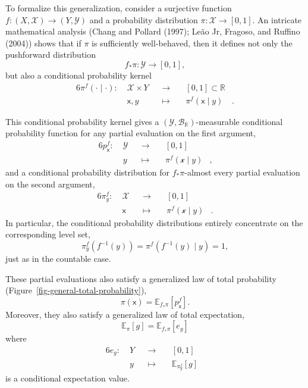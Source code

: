 \documentclass[
  letterpaper,
  DIV=11,
  numbers=noendperiod]{scrartcl}
\begin{document}
To formalize this generalization, consider a surjective function
\(f : (X, \mathcal{X}) \rightarrow (Y, \mathcal{Y})\) and a probability
distribution \(\pi : \mathcal{X} \rightarrow [0, 1]\). An intricate
mathematical analysis (Chang and Pollard (1997); Leão Jr, Fragoso, and
Ruffino (2004)) shows that if \(\pi\) is sufficiently well-behaved, then
it defines not only the pushforward distribution \[
f_{*} \pi : \mathcal{Y} \rightarrow [0, 1],
\] but also a conditional probability kernel \begin{alignat*}{6}
\pi^{f} ( \cdot \mid \cdot )
:\; &\mathcal{X} \times Y& &\rightarrow& \; &[0, 1] \subset \mathbb{R}&
\\
&\mathsf{x}, y& &\mapsto& &\pi^{f} ( \mathsf{x} \mid y )&.
\end{alignat*}

This conditional probability kernel gives a
\((\mathcal{Y}, \mathcal{B}_{\mathbb{R}})\)-measurable conditional
probability function for any partial evaluation on the first argument,
\begin{alignat*}{6}
p^{f}_{ \mathsf{x} }
:\; &\mathcal{Y}& &\rightarrow& \; &[0, 1]&
\\
&y& &\mapsto& &\pi^{f} ( \mathcal{x} \mid y ) &,
\end{alignat*} and a conditional probability distribution for
\(f_{*} \pi\)-almost every partial evaluation on the second argument,
\begin{alignat*}{6}
\pi^{f}_{y}
:\; &\mathcal{X}& &\rightarrow& \; &[0, 1]&
\\
&\mathsf{x}& &\mapsto& &\pi^{f} ( \mathcal{x} \mid y ) &.
\end{alignat*} In particular, the conditional probability distributions
entirely concentrate on the corresponding level set, \[
\pi^{f}_{y}( f^{-1}(y) ) = \pi^{f}( f^{-1}(y) \mid y ) = 1,
\] just as in the countable case.

These partial evaluations also satisfy a generalized law of total
probability (Figure~\ref{fig-general-total-probability}), \[
\pi( \mathsf{x} )
=
\mathbb{E}_{f_{*} \pi} [ p^{f}_{ \mathsf{x} } ].
\] Moreover, they also satisfy a generalized law of total expectation,
\[
\mathbb{E}_{\pi}[g]
=
\mathbb{E}_{f_{*} \pi} [ e_{g} ]
\] where \begin{alignat*}{6}
e_{g} :\; &Y& &\rightarrow& \; &[0, 1]&
\\
&y& &\mapsto& &\mathbb{E}_{\pi^{f}_{y} }[ g ] &
\end{alignat*} is a conditional expectation value.
\end{document}
